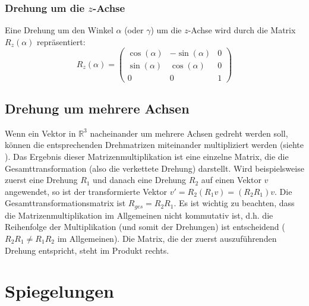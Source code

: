\subsubsection*{Drehung um die $z$-Achse}
Eine Drehung um den Winkel $\alpha$ (oder $\gamma$) um die $z$-Achse wird durch die Matrix $R_z(\alpha)$ repräsentiert:
\[
   R_z(\alpha) = \begin{pmatrix}
       \cos(\alpha) & -\sin(\alpha) & 0 \\
       \sin(\alpha) & \cos(\alpha) & 0 \\
       0 & 0 & 1
   \end{pmatrix}
\]

\subsection{Drehung um mehrere Achsen}
Wenn ein Vektor in $\mathbb{R}^3$ nacheinander um mehrere Achsen gedreht werden soll, können die entsprechenden Drehmatrizen miteinander multipliziert werden (siehte ). Das Ergebnis dieser Matrizenmultiplikation ist eine einzelne Matrix, die die Gesamttransformation (also die verkettete Drehung) darstellt.
Wird beispielsweise zuerst eine Drehung $R_1$ und danach eine Drehung $R_2$ auf einen Vektor $v$ angewendet, so ist der transformierte Vektor $v' = R_2 (R_1 v) = (R_2 R_1) v$. Die Gesamttransformationsmatrix ist $R_{ges} = R_2 R_1$.
Es ist wichtig zu beachten, dass die Matrizenmultiplikation im Allgemeinen nicht kommutativ ist, d.h. die Reihenfolge der Multiplikation (und somit der Drehungen) ist entscheidend ($R_2 R_1 \neq R_1 R_2$ im Allgemeinen). Die Matrix, die der zuerst auszuführenden Drehung entspricht, steht im Produkt rechts.

\section{Spiegelungen}